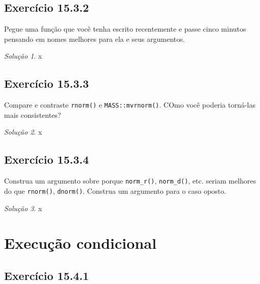\documentclass[
]{latex/krantz}
\theoremstyle{definition}
\theoremstyle{definition}
\theoremstyle{definition}
\theoremstyle{definition}
\theoremstyle{remark}
\newtheorem*{solution}{Solução}
\begin{document}
\hypertarget{exr15-3-2}{%
\subsection*{Exercício 15.3.2}\label{exr15-3-2}}

Pegue uma função que você tenha escrito recentemente e passe cinco minutos pensando em nomes melhores para ela e seus argumentos.

\begin{solution}
x
\end{solution}

\hypertarget{exr15-3-3}{%
\subsection*{Exercício 15.3.3}\label{exr15-3-3}}

Compare e contraste \texttt{rnorm()} e \texttt{MASS::mvrnorm()}. COmo você poderia torná-las mais consistentes?

\begin{solution}
x
\end{solution}

\hypertarget{exr15-3-4}{%
\subsection*{Exercício 15.3.4}\label{exr15-3-4}}

Construa um argumento sobre porque \texttt{norm\_r()}, \texttt{norm\_d()}, etc. seriam melhores do que \texttt{rnorm()}, \texttt{dnorm()}. Construa um argumento para o caso oposto.

\begin{solution}
x
\end{solution}

\hypertarget{execuuxe7uxe3o-condicional}{%
\section{Execução condicional}\label{execuuxe7uxe3o-condicional}}

\hypertarget{exr15-4-1}{%
\subsection*{Exercício 15.4.1}\label{exr15-4-1}}
\end{document}
